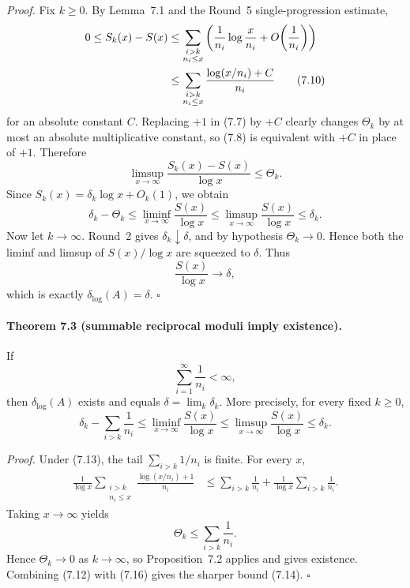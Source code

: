\emph{Proof.}
Fix \(k\ge 0\).  By Lemma~7.1 and the Round~5 single-progression estimate,
\begin{align}
0\le S_k(x)-S(x)
&\le
\sum_{\substack{i>k\\ n_i\le x}}
\left(
\frac1{n_i}\log\frac{x}{n_i}+O\!\left(\frac1{n_i}\right)
\right) \notag\\
&\le
\sum_{\substack{i>k\\ n_i\le x}}
\frac{\log(x/n_i)+C}{n_i}
\tag{7.10}
\end{align}
for an absolute constant \(C\).  Replacing \(+1\) in (7.7) by \(+C\) clearly changes \(\Theta_k\) by at most an absolute
multiplicative constant, so (7.8) is equivalent with \(+C\) in place of \(+1\).
Therefore
\begin{equation}
\limsup_{x\to\infty}\frac{S_k(x)-S(x)}{\log x}\le \Theta_k.
\tag{7.11}
\end{equation}
Since \(S_k(x)=\delta_k\log x+O_k(1)\), we obtain
\begin{equation}
\delta_k-\Theta_k
\le
\liminf_{x\to\infty}\frac{S(x)}{\log x}
\le
\limsup_{x\to\infty}\frac{S(x)}{\log x}
\le
\delta_k.
\tag{7.12}
\end{equation}
Now let \(k\to\infty\).  Round~2 gives \(\delta_k\downarrow\delta\), and by hypothesis \(\Theta_k\to 0\).  Hence
both the liminf and limsup of \(S(x)/\log x\) are squeezed to \(\delta\).  Thus
\[
\frac{S(x)}{\log x}\to \delta,
\]
which is exactly \(\delta_{\log}(A)=\delta\).  \hfill \(\square\)

\paragraph{Theorem 7.3 (summable reciprocal moduli imply existence).}
If
\begin{equation}
\sum_{i=1}^{\infty}\frac1{n_i}<\infty,
\tag{7.13}
\end{equation}
then \(\delta_{\log}(A)\) exists and equals \(\delta=\lim_k\delta_k\).
More precisely, for every fixed \(k\ge 0\),
\begin{equation}
\delta_k-\sum_{i>k}\frac1{n_i}
\le
\liminf_{x\to\infty}\frac{S(x)}{\log x}
\le
\limsup_{x\to\infty}\frac{S(x)}{\log x}
\le
\delta_k.
\tag{7.14}
\end{equation}

\emph{Proof.}
Under (7.13), the tail \(\sum_{i>k}1/n_i\) is finite.  For every \(x\),
\begin{align}
\frac1{\log x}
\sum_{\substack{i>k\\ n_i\le x}}
\frac{\log(x/n_i)+1}{n_i}
&\le
\sum_{i>k}\frac1{n_i}
+
\frac1{\log x}\sum_{i>k}\frac1{n_i}.
\tag{7.15}
\end{align}
Taking \(x\to\infty\) yields
\begin{equation}
\Theta_k\le \sum_{i>k}\frac1{n_i}.
\tag{7.16}
\end{equation}
Hence \(\Theta_k\to 0\) as \(k\to\infty\), so Proposition~7.2 applies and gives existence.
Combining (7.12) with (7.16) gives the sharper bound (7.14).  \hfill \(\square\)


